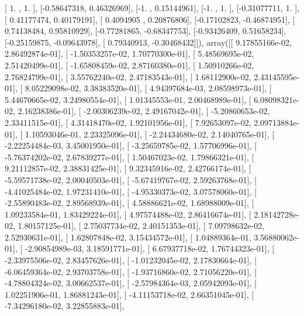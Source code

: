 \documentclass{article}
\begin{document}
       [ 1.        ,  1.        ],
       [-0.58647318,  0.46326969],
       [-1.        ,  0.15144961],
       [-1.        ,  1.        ],
       [-0.31077711,  1.        ],
       [ 0.41177474,  0.40179191],
       [ 0.4094905 ,  0.20876806],
       [-0.17102823, -0.46874951],
       [ 0.74138484,  0.95810929],
       [-0.77281865, -0.68347753],
       [-0.93426409,  0.51658234],
       [-0.25159875, -0.09643978],
       [ 0.79340913, -0.30468432]]), array([[  9.17855166e-02,   2.86492874e-01],
       [ -1.50353257e-02,   1.70770300e-01],
       [  5.48569695e-02,   2.51420499e-01],
       [ -1.65808459e-02,   2.87160380e-01],
       [  1.50910266e-02,   2.76824799e-01],
       [  3.55762240e-02,   2.47183543e-01],
       [  1.68112900e-02,   2.43145595e-01],
       [  8.05229098e-02,   3.38383520e-01],
       [  4.94397684e-03,   2.08598973e-01],
       [  5.44670665e-02,   3.24980554e-01],
       [  1.01345553e-01,   2.00468989e-01],
       [  6.08098321e-02,   2.16238386e-01],
       [ -2.00306239e-02,   2.49167042e-01],
       [ -5.20860653e-02,   2.33411515e-01],
       [  4.31418470e-02,   1.92101956e-01],
       [  7.92653097e-02,   2.09713884e-01],
       [  1.10593046e-01,   2.23325096e-01],
       [ -2.24434680e-02,   2.14040765e-01],
       [ -2.22254484e-03,   3.45001950e-01],
       [ -3.25659785e-02,   1.57706996e-01],
       [ -5.76374202e-02,   2.67839277e-01],
       [  1.50467023e-02,   1.79866321e-01],
       [  9.21112857e-02,   2.38831425e-01],
       [  9.32345916e-02,   2.42766174e-01],
       [ -5.59571738e-02,   2.00040503e-01],
       [ -5.67419767e-02,   2.59263768e-01],
       [ -4.41025484e-02,   1.97231410e-01],
       [ -4.95330373e-02,   3.07578060e-01],
       [ -2.55890483e-02,   2.89568939e-01],
       [  4.58886621e-02,   1.68988009e-01],
       [  1.09233584e-01,   1.83429224e-01],
       [  4.97574488e-02,   2.86416674e-01],
       [  2.18142728e-02,   1.80157125e-01],
       [  2.75037734e-02,   2.40151353e-01],
       [  7.09798632e-02,   2.52930631e-01],
       [  1.62807848e-02,   3.15434572e-01],
       [  1.04889364e-01,   3.56880062e-01],
       [ -2.90854989e-03,   3.18591771e-01],
       [  6.67937718e-02,   1.76744323e-01],
       [ -2.33975506e-02,   2.83457626e-01],
       [ -1.01232045e-02,   2.17830664e-01],
       [ -6.06459364e-02,   2.93703758e-01],
       [ -1.93716860e-02,   2.71056220e-01],
       [ -4.78804324e-02,   3.00662537e-01],
       [ -2.57984364e-03,   2.05942093e-01],
       [  1.02251906e-01,   1.86881243e-01],
       [ -4.11153718e-02,   2.66351045e-01],
       [ -7.34296180e-02,   3.22855883e-01],
\end{document}
